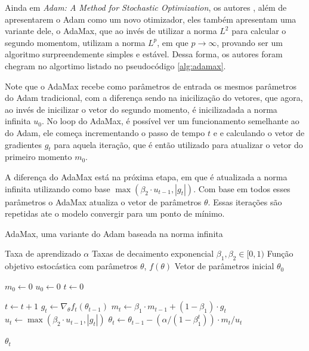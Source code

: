 Ainda em \textit{Adam: A Method for Stochastic Optimization}, os autores \textcite{AdamMethod}, além de apresentarem o Adam como um novo otimizador, eles também apresentam uma variante dele, o AdaMax, que ao invés de utilizar a norma $L^2$ para calcular o segundo momentom, utilizam a norma $L^p$, em que $p \to \infty$, provando ser um algoritmo surpreendemente simples e estável. Dessa forma, os autores foram  chegram no algortimo listado no pseudocódigo \ref{alg:adamax}.

Note que o AdaMax recebe como parâmetros de entrada os mesmos parâmetros do Adam tradicional, com a diferença sendo na inicilização do vetores, que agora, ao invés de inicilizar o vetor do segundo momento, é inicilizadada a norma infinita $u_0$. No loop do AdaMax, é possível ver um funcionamento semelhante ao do Adam, ele começa incrementando o passo de tempo $t$ e e calculando o vetor de gradientes $g_t$ para aquela iteração, que é então utilizado para atualizar o vetor do primeiro momento $m_0$.

A diferença do AdaMax está na próxima etapa, em que é atualizada a norma infinita utilizando como base $\max(\beta_2 \cdot u_{t-1}, |g_t|)$. Com base em todos esses parâmetros o AdaMax atualiza o vetor de parâmetros $\theta$. Essas iterações são repetidas ate o modelo convergir para um ponto de mínimo.

\begin{algorithm}[H] %
    \caption{AdaMax, uma variante do Adam baseada na norma infinita}
    \label{alg:adamax}
    \begin{algorithmic}[1] %

    \Require Taxa de aprendizado $\alpha$
    \Require Taxas de decaimento exponencial $\beta_1, \beta_2 \in [0, 1)$
    \Require Função objetivo estocástica com parâmetros $\theta$, $f(\theta)$
    \Require Vetor de parâmetros inicial $\theta_0$

    \State $m_0 \leftarrow 0$ 
    \State $u_0 \leftarrow 0$ 
    \State $t \leftarrow 0$ 

        \State $t \leftarrow t + 1$
        \State $g_t \leftarrow \nabla_\theta f_t(\theta_{t-1})$ 
        \State $m_t \leftarrow \beta_1 \cdot m_{t-1} + (1 - \beta_1) \cdot g_t$ 
        \State $u_t \leftarrow \max(\beta_2 \cdot u_{t-1}, |g_t|)$ 
        \State $\theta_t \leftarrow \theta_{t-1} - (\alpha / (1 - \beta_1^t)) \cdot m_t / u_t$ 
    \EndWhile

    \State \Return $\theta_t$ 
    \end{algorithmic}
\end{algorithm}

